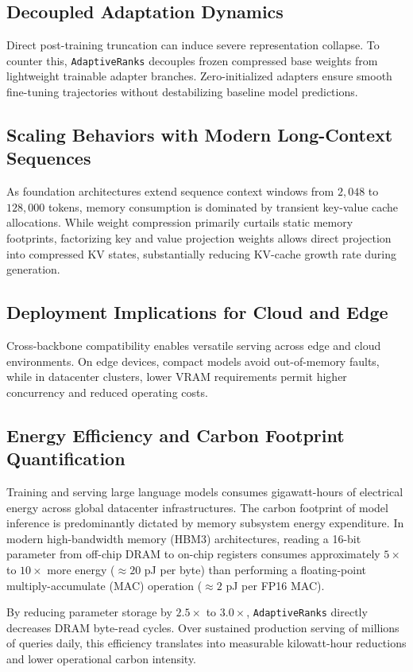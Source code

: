 \subsection{Decoupled Adaptation Dynamics}
Direct post-training truncation can induce severe representation collapse. To counter this, \texttt{AdaptiveRanks} decouples frozen compressed base weights from lightweight trainable adapter branches. Zero-initialized adapters ensure smooth fine-tuning trajectories without destabilizing baseline model predictions.

\subsection{Scaling Behaviors with Modern Long-Context Sequences}
As foundation architectures extend sequence context windows from $2{,}048$ to $128{,}000$ tokens, memory consumption is dominated by transient key-value cache allocations. While weight compression primarily curtails static memory footprints, factorizing key and value projection weights allows direct projection into compressed KV states, substantially reducing KV-cache growth rate during generation.

\subsection{Deployment Implications for Cloud and Edge}
Cross-backbone compatibility enables versatile serving across edge and cloud environments. On edge devices, compact models avoid out-of-memory faults, while in datacenter clusters, lower VRAM requirements permit higher concurrency and reduced operating costs.

\subsection{Energy Efficiency and Carbon Footprint Quantification}
Training and serving large language models consumes gigawatt-hours of electrical energy across global datacenter infrastructures. The carbon footprint of model inference is predominantly dictated by memory subsystem energy expenditure. In modern high-bandwidth memory (HBM3) architectures, reading a 16-bit parameter from off-chip DRAM to on-chip registers consumes approximately $5\times$ to $10\times$ more energy ($\approx 20$ pJ per byte) than performing a floating-point multiply-accumulate (MAC) operation ($\approx 2$ pJ per FP16 MAC).

By reducing parameter storage by $2.5\times$ to $3.0\times$, \texttt{AdaptiveRanks} directly decreases DRAM byte-read cycles. Over sustained production serving of millions of queries daily, this efficiency translates into measurable kilowatt-hour reductions and lower operational carbon intensity.


